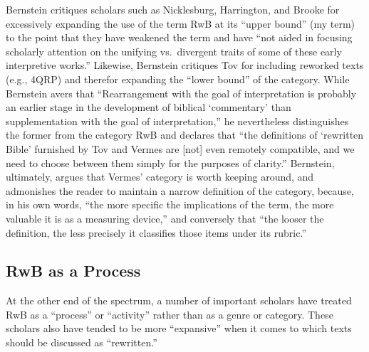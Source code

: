 Bernstein critiques scholars such as
Nicklesburg,\autocite{nickelsburg_stone1984}
Harrington,\autocite{harrington_kraft-nickelsburg1986} and
Brooke\autocite{brooke_schiffman-vanderkam2000} for excessively
expanding the use of the term RwB at its ``upper bound'' (my term) to
the point that they have weakened the term and have ``not aided in
focusing scholarly attention on the unifying vs.~divergent traits of
some of these early interpretive
works.''\autocite[179]{bernstein_textus2005} Likewise, Bernstein
critiques Tov for including reworked texts (e.g., 4QRP) and therefor
expanding the ``lower bound'' of the category. While Bernstein avers
that ``Rearrangement with the goal of interpretation is probably an
earlier stage in the development of biblical `commentary' than
supplementation with the goal of interpretation,'' he nevertheless
distinguishes the former from the category RwB and declares that ``the
definitions of `rewritten Bible' furnished by Tov and Vermes are
{[}not{]} even remotely compatible, and we need to choose between them
simply for the purposes of
clarity.''\autocite[185]{bernstein_textus2005} Bernstein, ultimately,
argues that Vermes' category is worth keeping around, and admonishes the
reader to maintain a narrow definition of the category, because, in his
own words, ``the more specific the implications of the term, the more
valuable it is as a measuring
device,''\autocite[195]{bernstein_textus2005} and conversely that ``the
looser the definition, the less precisely it classifies those items
under its rubric.'' \autocite[195]{bernstein_textus2005}

\subsection{RwB as a Process}\label{rwb-as-a-process}

At the other end of the spectrum, a number of important scholars have
treated RwB as a ``process'' or ``activity'' rather than as a genre or
category. These scholars also have tended to be more ``expansive'' when
it comes to which texts should be discussed as ``rewritten.''

